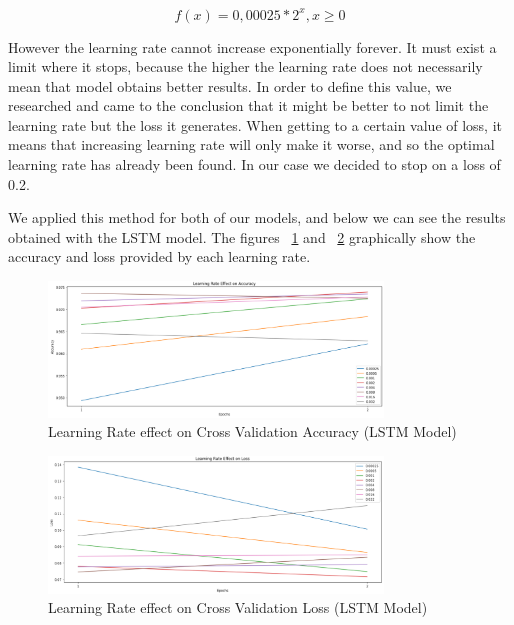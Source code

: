 \documentclass[conference]{IEEEtran}
\begin{document}
\begin{equation*}
  f(x) = 0,00025 * 2^x , x\geqslant0
\end{equation*}

However the learning rate cannot increase exponentially forever. It must exist a limit where it stops, because the higher the learning rate does not necessarily mean that model obtains better results. In order to define this value, we researched and came to the conclusion that it might be better to not limit the learning rate but the loss it generates. When getting to a certain value of loss, it means that increasing learning rate will only make it worse, and so the optimal learning rate has already been found. In our case we decided to stop on a loss of 0.2.

We applied this method for both of our models, and below we can see the results obtained with the LSTM model. The figures ~\ref{fig:model1_learning_rate_acc} and ~\ref{fig:model1_learning_rate_loss} graphically show the accuracy and loss provided by each learning rate.

\begin{figure}[H]
    \centering
    \includegraphics[width=3.5in]{pictures/model1_learning_rate_accuracy.png}
    \caption{Learning Rate effect on Cross Validation Accuracy (LSTM Model)}\label{fig:model1_learning_rate_acc}
\end{figure}

\begin{figure}[H]
    \centering
    \includegraphics[width=3.5in]{pictures/model1_learning_rate_loss.png}
    \caption{Learning Rate effect on Cross Validation Loss (LSTM Model)}\label{fig:model1_learning_rate_loss}
\end{figure}
\end{document}
